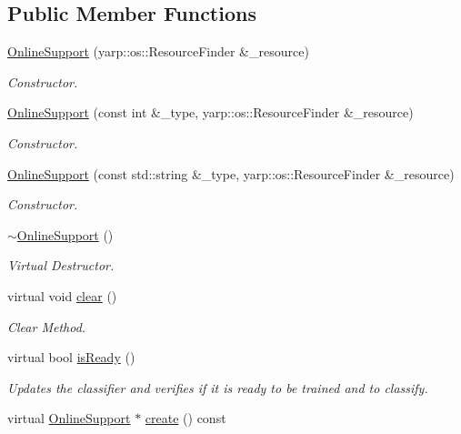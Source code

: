 \subsection*{Public Member Functions}
\begin{DoxyCompactItemize}
\item 
\hyperlink{classiCub_1_1boostMIL_1_1OnlineSupport_a3a8873e6541fb8bcd0c47734d8340aac}{Online\+Support} (yarp\+::os\+::\+Resource\+Finder \&\+\_\+resource)
\begin{DoxyCompactList}\small\item\em Constructor. \end{DoxyCompactList}\item 
\hyperlink{classiCub_1_1boostMIL_1_1OnlineSupport_a7a84ae88d59cade203fd724f2f8142c2}{Online\+Support} (const int \&\+\_\+type, yarp\+::os\+::\+Resource\+Finder \&\+\_\+resource)
\begin{DoxyCompactList}\small\item\em Constructor. \end{DoxyCompactList}\item 
\hyperlink{classiCub_1_1boostMIL_1_1OnlineSupport_a3127ecd0e3ebce7fdbdae50b83c6e265}{Online\+Support} (const std\+::string \&\+\_\+type, yarp\+::os\+::\+Resource\+Finder \&\+\_\+resource)
\begin{DoxyCompactList}\small\item\em Constructor. \end{DoxyCompactList}\item 
\hyperlink{classiCub_1_1boostMIL_1_1OnlineSupport_a2ac7012fd334bd199608689cc48a706d}{$\sim$\+Online\+Support} ()\label{classiCub_1_1boostMIL_1_1OnlineSupport_a2ac7012fd334bd199608689cc48a706d}

\begin{DoxyCompactList}\small\item\em Virtual Destructor. \end{DoxyCompactList}\item 
virtual void \hyperlink{classiCub_1_1boostMIL_1_1OnlineSupport_a89690fa5f4c74c09f24a39593261090a}{clear} ()
\begin{DoxyCompactList}\small\item\em Clear Method. \end{DoxyCompactList}\item 
virtual bool \hyperlink{classiCub_1_1boostMIL_1_1OnlineSupport_a73b90fb8ac2d79c05a66cbea4367d378}{is\+Ready} ()
\begin{DoxyCompactList}\small\item\em Updates the classifier and verifies if it is ready to be trained and to classify. \end{DoxyCompactList}\item 
virtual \hyperlink{classiCub_1_1boostMIL_1_1OnlineSupport}{Online\+Support} $\ast$ \hyperlink{classiCub_1_1boostMIL_1_1OnlineSupport_a2d88301c2668ab256edc89f685d1da14}{create} () const \label{classiCub_1_1boostMIL_1_1OnlineSupport_a2d88301c2668ab256edc89f685d1da14}


\end{DoxyCompactItemize}
